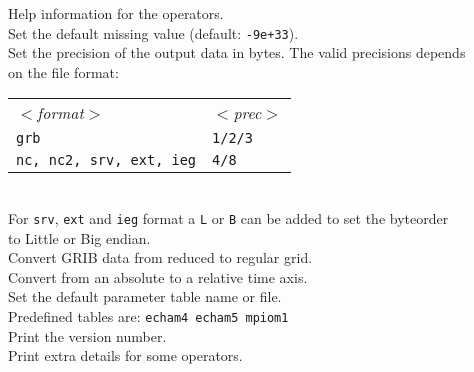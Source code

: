 \begin{tabbing}
         \> Help information for the operators. \\
         \> Set the default missing value (default: {\tt-9e+33}). \\
         \> Set the precision of the output data in bytes. The valid precisions depends \\
         \> on the file format:\\
         \> \parbox[r]{3in}{
              \vspace*{1mm}
              \hspace*{0cm}\begin{tabular}{|l|l|}
              \hline
              \rowcolor[gray]{.9}
                \sl $<$format$>$ & \sl $<$prec$>$ \\
                {\tt grb}                    & {\tt 1/2/3} \\
                {\tt nc, nc2, srv, ext, ieg} & {\tt 4/8}   \\
              \hline
              \end{tabular}
              \vspace*{1mm}
            } \\
         \> For {\tt srv}, {\tt ext} and {\tt ieg} format a {\tt L} or {\tt B} can be added to set the byteorder \\
         \> to Little or Big endian. \\
         \> Convert GRIB data from reduced to regular grid. \\
         \> Convert from an absolute to a relative time axis. \\
         \> Set the default parameter table name or file.\\
         \> Predefined tables are:  {\tt echam4 echam5 mpiom1}\\
         \> Print the version number. \\
         \> Print extra details for some operators. \\
\end{tabbing}


